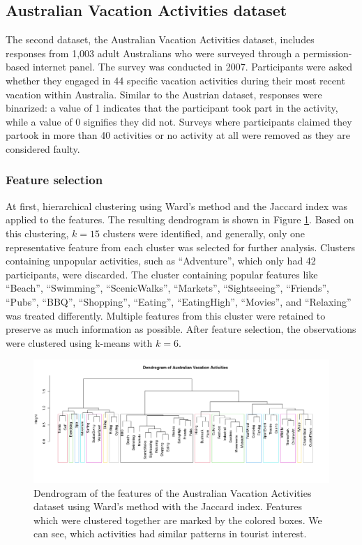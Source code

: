 \documentclass[article]{ajs}
\begin{document}
\subsection{Australian Vacation Activities dataset}

The second dataset, the Australian Vacation Activities dataset, includes responses from 1,003 adult Australians who were surveyed through a permission-based internet panel. The survey was conducted in 2007. Participants were asked whether they engaged in 44 specific vacation activities during their most recent vacation within Australia. Similar to the Austrian dataset, responses were binarized: a value of 1 indicates that the participant took part in the activity, while a value of 0 signifies they did not. Surveys where participants claimed they partook in more than 40 activities or no activity at all were removed as they are considered faulty.

\subsubsection{Feature selection}

At first, hierarchical clustering using Ward's method \citep{murtagh2014ward} and the Jaccard index was applied to the features. The resulting dendrogram is shown in Figure \ref{fig:aus_feature_clustering}. Based on this clustering, \( k = 15 \) clusters were identified, and generally, only one representative feature from each cluster was selected for further analysis. Clusters containing unpopular activities, such as ``Adventure'', which only had 42 participants, were discarded. The cluster containing popular features like ``Beach'', ``Swimming'', ``ScenicWalks'', ``Markets'', ``Sightseeing'', ``Friends'', ``Pubs'', ``BBQ'', ``Shopping'', ``Eating'', ``EatingHigh'', ``Movies'', and ``Relaxing'' was treated differently. Multiple features from this cluster were retained to preserve as much information as possible. After feature selection, the observations were clustered using k-means with \( k = 6 \).


\begin{figure}[h!]
    \centering
    \includegraphics[width=1\textwidth]{aus_feature_clustering.png}
    \caption{Dendrogram of the features of the Australian Vacation Activities dataset using Ward's method with the Jaccard index. Features which were clustered together are marked by the colored boxes. We can see, which activities had similar patterns in tourist interest.}
    \label{fig:aus_feature_clustering}
\end{figure}
\end{document}
